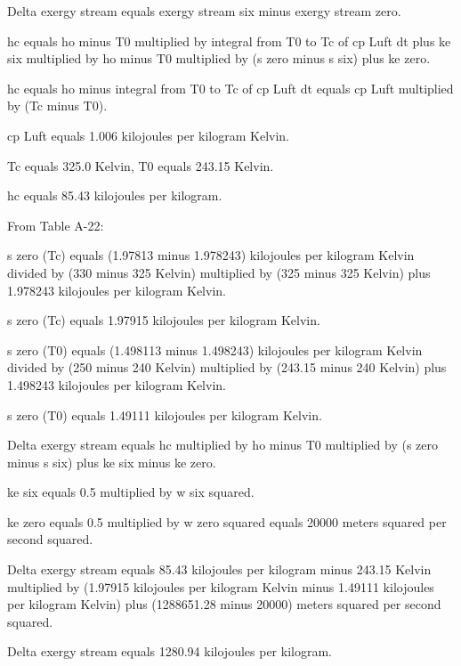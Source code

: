 Delta exergy stream equals exergy stream six minus exergy stream zero.  

hc equals ho minus T0 multiplied by integral from T0 to Tc of cp Luft dt plus ke six multiplied by ho minus T0 multiplied by (s zero minus s six) plus ke zero.  

hc equals ho minus integral from T0 to Tc of cp Luft dt equals cp Luft multiplied by (Tc minus T0).  

cp Luft equals 1.006 kilojoules per kilogram Kelvin.  

Tc equals 325.0 Kelvin, T0 equals 243.15 Kelvin.  

hc equals 85.43 kilojoules per kilogram.  

From Table A-22:  

s zero (Tc) equals (1.97813 minus 1.978243) kilojoules per kilogram Kelvin divided by (330 minus 325 Kelvin) multiplied by (325 minus 325 Kelvin) plus 1.978243 kilojoules per kilogram Kelvin.  

s zero (Tc) equals 1.97915 kilojoules per kilogram Kelvin.  

s zero (T0) equals (1.498113 minus 1.498243) kilojoules per kilogram Kelvin divided by (250 minus 240 Kelvin) multiplied by (243.15 minus 240 Kelvin) plus 1.498243 kilojoules per kilogram Kelvin.  

s zero (T0) equals 1.49111 kilojoules per kilogram Kelvin.  

Delta exergy stream equals hc multiplied by ho minus T0 multiplied by (s zero minus s six) plus ke six minus ke zero.  

ke six equals 0.5 multiplied by w six squared.  

ke zero equals 0.5 multiplied by w zero squared equals 20000 meters squared per second squared.  

Delta exergy stream equals 85.43 kilojoules per kilogram minus 243.15 Kelvin multiplied by (1.97915 kilojoules per kilogram Kelvin minus 1.49111 kilojoules per kilogram Kelvin) plus (1288651.28 minus 20000) meters squared per second squared.  

Delta exergy stream equals 1280.94 kilojoules per kilogram.